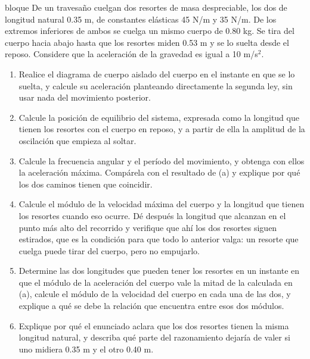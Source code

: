\documentclass[11pt,openany]{book}
\begin{document}
\begin{ejercicio}{bloque}
De un travesaño cuelgan dos resortes de masa despreciable, los dos de longitud natural 0.35 m, de constantes elásticas 45 N/m y 35 N/m. De los extremos inferiores de ambos se cuelga un mismo cuerpo de 0.80 kg. Se tira del cuerpo hacia abajo hasta que los resortes miden 0.53 m y se lo suelta desde el reposo. Considere que la aceleración de la gravedad es igual a 10 m/s$^2$.
\begin{enumerate}[label=(\alph*), leftmargin=1.7em, itemsep=1pt, topsep=3pt]
  \item Realice el diagrama de cuerpo aislado del cuerpo en el instante en que se lo suelta, y calcule su aceleración planteando directamente la segunda ley, sin usar nada del movimiento posterior.
  \item Calcule la posición de equilibrio del sistema, expresada como la longitud que tienen los resortes con el cuerpo en reposo, y a partir de ella la amplitud de la oscilación que empieza al soltar.
  \item Calcule la frecuencia angular y el período del movimiento, y obtenga con ellos la aceleración máxima. Compárela con el resultado de (a) y explique por qué los dos caminos tienen que coincidir.
  \item Calcule el módulo de la velocidad máxima del cuerpo y la longitud que tienen los resortes cuando eso ocurre. Dé después la longitud que alcanzan en el punto más alto del recorrido y verifique que ahí los dos resortes siguen estirados, que es la condición para que todo lo anterior valga: un resorte que cuelga puede tirar del cuerpo, pero no empujarlo.
  \item Determine las dos longitudes que pueden tener los resortes en un instante en que el módulo de la aceleración del cuerpo vale la mitad de la calculada en (a), calcule el módulo de la velocidad del cuerpo en cada una de las dos, y explique a qué se debe la relación que encuentra entre esos dos módulos.
  \item Explique por qué el enunciado aclara que los dos resortes tienen la misma longitud natural, y describa qué parte del razonamiento dejaría de valer si uno midiera 0.35 m y el otro 0.40 m.
\end{enumerate}
\end{ejercicio}
\end{document}
